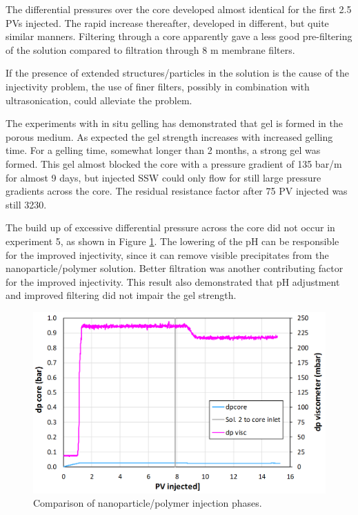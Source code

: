 \documentclass[journal = enfuem, manuscript =  article]{achemso}
\begin{document}
The differential pressures over the core developed almost identical for the first 2.5 PVs injected. The rapid increase thereafter, developed in different, but quite similar manners. Filtering through a core apparently gave a less good pre-filtering of the solution compared to filtration through 8 \micro m membrane filters.

If the presence of extended structures/particles in the solution is the cause of the injectivity problem, the use of finer filters, possibly in combination with ultrasonication, could alleviate the problem.

The experiments with in situ gelling has demonstrated that gel is formed in the porous medium. As expected the gel strength increases with increased gelling time. For a gelling time, somewhat longer than 2 months, a strong gel was formed. This gel almost blocked the core with a pressure gradient of 135 bar/m for almost 9 days, but injected SSW could only flow for still large pressure gradients across the core. The residual resistance factor after 75 PV injected was still 3230.

The build up of excessive differential pressure across the core did not occur in experiment 5, as shown in Figure \ref{cht:gelexp5_1}. The lowering of the pH can be responsible for the improved injectivity, since it can remove visible precipitates from the nanoparticle/polymer solution. Better filtration was another contributing factor for the improved injectivity. This result also demonstrated that pH adjustment and improved filtering did not impair the gel strength. 

\begin{figure}[h!]
    \centering
    \includegraphics[width=.7\textwidth]{fig/gelexp5_1.png}
    \caption{Comparison of nanoparticle/polymer injection phases.}
    \label{cht:gelexp5_1} %
\end{figure}
\end{document}
